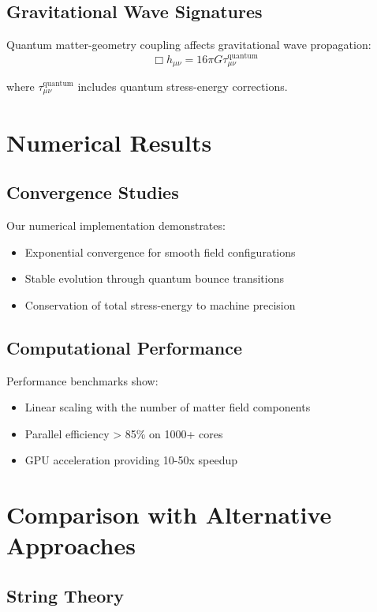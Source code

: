 \documentclass[11pt]{article}
\begin{document}
\subsection{Gravitational Wave Signatures}

Quantum matter-geometry coupling affects gravitational wave propagation:
\begin{equation}
\Box h_{\mu\nu} = 16\pi G \tau_{\mu\nu}^{\text{quantum}}
\end{equation}

where $\tau_{\mu\nu}^{\text{quantum}}$ includes quantum stress-energy corrections.

\section{Numerical Results}

\subsection{Convergence Studies}

Our numerical implementation demonstrates:
\begin{itemize}
\item Exponential convergence for smooth field configurations
\item Stable evolution through quantum bounce transitions
\item Conservation of total stress-energy to machine precision
\end{itemize}

\subsection{Computational Performance}

Performance benchmarks show:
\begin{itemize}
\item Linear scaling with the number of matter field components
\item Parallel efficiency > 85\% on 1000+ cores
\item GPU acceleration providing 10-50x speedup
\end{itemize}

\section{Comparison with Alternative Approaches}

\subsection{String Theory}
\end{document}
